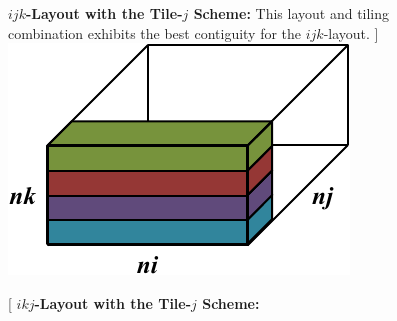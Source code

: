 \documentclass[10pt, conference, compsocconf]{IEEEtran}
\begin{document}
\begin{figure}[!bth]
\begin{minipage}{0.49\textwidth}
      \textbf{\(ijk\)-Layout with the Tile-\(j\) Scheme:}
      This layout and tiling combination exhibits the best contiguity for the 
        \(ijk\)-layout.
    ]{
      \includegraphics[width=0.70\columnwidth]{figures/tiling/ijk_layout_tile_j_scheme_diagram.pdf}
      \label{fig:impl:tiling:ijk_tile_j_scheme}
    }
  \end{minipage}
  \hspace{0em}
  \begin{minipage}{0.49\textwidth}
    \centering
  \end{minipage}
  \begin{minipage}{0.49\textwidth}
    \centering
    \subfloat[
      \textbf{\(ikj\)-Layout with the Tile-\(j\) Scheme:}

\end{minipage}
\end{figure}
\end{document}
